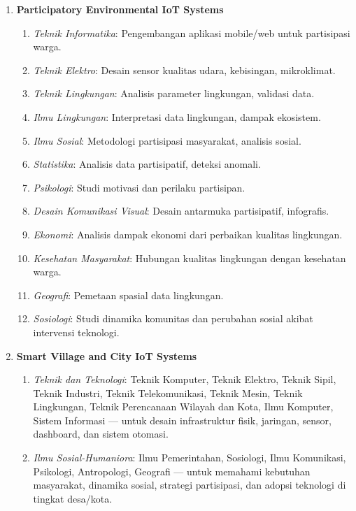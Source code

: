 \documentclass[12pt,a4paper]{article}
\begin{document}
\begin{enumerate}[leftmargin=*]
    \item \textbf{Participatory Environmental IoT Systems}
          \begin{enumerate}
              \item \textit{Teknik Informatika}: Pengembangan aplikasi mobile/web untuk partisipasi warga.
              \item \textit{Teknik Elektro}: Desain sensor kualitas udara, kebisingan, mikroklimat.
              \item \textit{Teknik Lingkungan}: Analisis parameter lingkungan, validasi data.
              \item \textit{Ilmu Lingkungan}: Interpretasi data lingkungan, dampak ekosistem.
              \item \textit{Ilmu Sosial}: Metodologi partisipasi masyarakat, analisis sosial.
              \item \textit{Statistika}: Analisis data partisipatif, deteksi anomali.
              \item \textit{Psikologi}: Studi motivasi dan perilaku partisipan.
              \item \textit{Desain Komunikasi Visual}: Desain antarmuka partisipatif, infografis.
              \item \textit{Ekonomi}: Analisis dampak ekonomi dari perbaikan kualitas lingkungan.
              \item \textit{Kesehatan Masyarakat}: Hubungan kualitas lingkungan dengan kesehatan warga.
              \item \textit{Geografi}: Pemetaan spasial data lingkungan.
              \item \textit{Sosiologi}: Studi dinamika komunitas dan perubahan sosial akibat intervensi teknologi.
          \end{enumerate}


    \item \textbf{Smart Village and City IoT Systems}
          \begin{enumerate}
              \item \textit{Teknik dan Teknologi}:
                    Teknik Komputer, Teknik Elektro, Teknik Sipil, Teknik Industri, Teknik Telekomunikasi, Teknik Mesin, Teknik Lingkungan, Teknik Perencanaan Wilayah dan Kota, Ilmu Komputer, Sistem Informasi — untuk desain infrastruktur fisik, jaringan, sensor, dashboard, dan sistem otomasi.

              \item \textit{Ilmu Sosial-Humaniora}:
                    Ilmu Pemerintahan, Sosiologi, Ilmu Komunikasi, Psikologi, Antropologi, Geografi — untuk memahami kebutuhan masyarakat, dinamika sosial, strategi partisipasi, dan adopsi teknologi di tingkat desa/kota.


\end{enumerate}
\end{enumerate}
\end{document}
